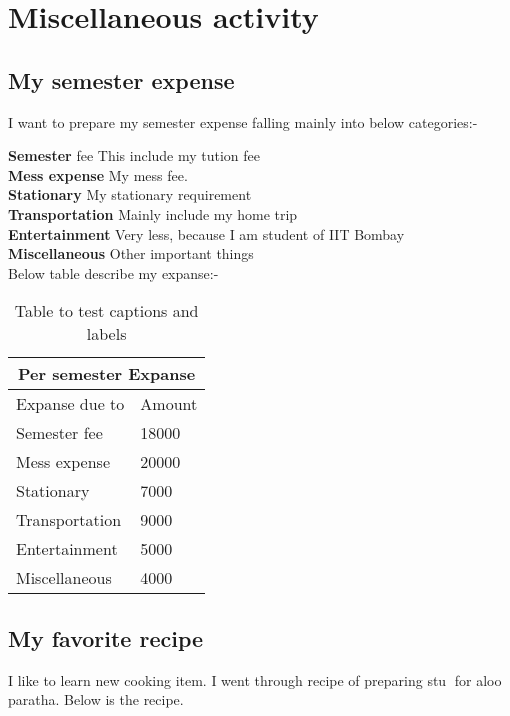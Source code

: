 \chapter{Miscellaneous activity}
\section{My semester expense}
I want to prepare my semester expense falling mainly into below categories:-


\textbf{Semester} fee This include my tution fee\\
\textbf{Mess expense} My mess fee.\\
\textbf{Stationary} My stationary requirement\\
\textbf{Transportation} Mainly include my home trip\\
\textbf{Entertainment} Very less, because I am student of IIT Bombay\\
\textbf{Miscellaneous} Other important things\\

Below table describe my expanse:-

\begin{table}[h!]
\centering
\begin{tabular}{ |p{4cm}|p{4cm}|  }
 \hline
 \multicolumn{2}{|c|}{Per semester Expanse} \\
 \hline
Expanse due to & Amount\\
 \hline
 
Semester fee   & 18000\\
Mess expense & 20000\\
Stationary & 7000\\
Transportation & 9000\\
Entertainment & 5000\\
Miscellaneous & 4000\\
 \hline
\end{tabular}
\caption{Table to test captions and labels}
\label{table:1}
\end{table}

\clearpage
\section{My favorite recipe}
I like to learn new cooking item. I went through recipe of preparing stu for aloo
paratha. Below is the recipe.\\\\




